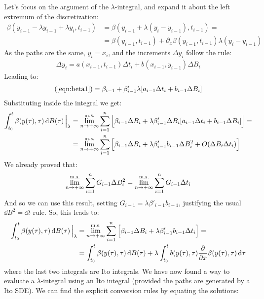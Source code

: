 \documentclass[../template.tex]{subfiles}
\begin{document}
\begin{exo}
Let's focus on the argument of the $\lambda$-integral, and expand it about the left extremum of the discretization:
\begin{align} \nonumber
    \beta(y_{i-1} - \lambda y_{i-1} + \lambda y_i, t_{i-1}) &= \beta(y_{i-1} + \lambda(y_i - y_{i-1}), t_{i-1}) =\\
    &= \beta(y_{i-1}, t_{i-1}) + \partial_x \beta(y_{i-1}, t_{i-1}) \lambda (y_i - y_{i-1}) \label{eqn:beta1}
\end{align}
As the paths are the same, $y_i = x_i$, and the increments $\Delta y_i$ follow the rule:
\begin{align*}
    \Delta y_i = a(x_{i-1}, t_{i-1}) \Delta t_i + b(x_{i-1}, y_{i-1}) \Delta B_i
\end{align*}
Leading to:
\begin{align*}
    (\ref{eqn:beta1}) = \beta_{i-1} + \beta_{i-1}' \lambda [a_{i-1}\Delta t_i + b_{i-1} \Delta B_i]
\end{align*}
Substituting inside the integral we get:
\begin{align*}
    \int_{t_0}^t \beta(y(\tau), \tau) \dd{B(\tau)} \Big|_{\lambda} &= \overset{\rm m.s.}{\lim_{n \to +\infty}} \sum_{i=1}^{n} \Big[\beta_{i-1} \Delta B_i + \lambda \beta'_{i-1} \Delta B_i [a_{i-1} \Delta t_i + b_{i-1} \Delta B_{i}] \Big] =\\
    &=\overset{\rm m.s.}{\lim_{n \to +\infty}} \sum_{i=1}^{n}\Big[
    \beta_{i-1} \Delta B_i + \lambda \beta_{i-1}' b_{i-1} \Delta B_i^2 + O(\Delta B_i \Delta t_i)    
    \Big]
\end{align*}
We already proved that:
\begin{align*}
    \overset{\rm m.s.}{\lim_{n \to +\infty}} \sum_{i=1}^n G_{i-1} \Delta B_i^2 = \overset{\rm m.s.}{\lim_{n \to +\infty}} \sum_{i=1}^n G_{i-1} \Delta t_i
\end{align*}
And so we can use this result, setting $G_{i-1} = \lambda \beta'_{i-1} b_{i-1}$, justifying the usual $\dd{B}^2 = \dd{t}$ rule. So, this leads to:
\begin{align} \nonumber 
    \int_{t_0}^t \beta(y(\tau), \tau) \dd{B(\tau)} \Big|_{\lambda} &= \overset{\rm m.s.}{\lim_{n \to +\infty}} \sum_{i=1}^{n} \Big[\beta_{i-1} \Delta B_i + \lambda \beta_{i-1}' b_{i-1} \Delta t_i \Big] = \\
    &=\int_{t_0}^t \beta(y(\tau), \tau) \dd{B(\tau)} + \lambda \int_{t_0}^t b(y(\tau), \tau) \pdv{x} \beta(y(\tau), \tau) \dd{\tau}
    \label{eqn:formula}
\end{align}
where the last two integrals are Ito integrals. We have now found a way to evaluate a $\lambda$-integral using an Ito integral (provided the paths are generated by a Ito SDE). We can find the explicit conversion rules by equating the solutions:

\end{exo}
\end{document}
